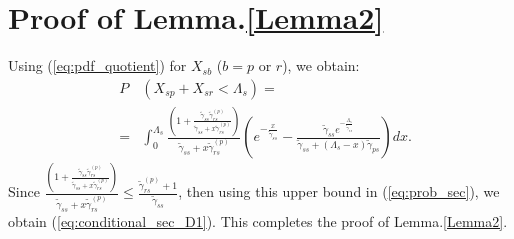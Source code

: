 \documentclass[conference,twocolumn]{IEEEtran}
\begin{document}
\section{Proof of Lemma.\ref{Lemma2}}
Using (\ref{eq:pdf_quotient}) for $X_{sb}$ ($b=p$ or $r$), we obtain:
\begin{eqnarray}
\label{eq:prob_sec}
&P&\left( X_{sp} + X_{sr} < \Lambda_s \right)=\\
\nonumber &=& \int_{0}^{\Lambda_s}{\frac{\left( 1+ \frac{\tilde{\gamma}_{ss}\tilde{\gamma}_{rs}^{(p)}}{\tilde{\gamma}_{ss}+x \tilde{\gamma}_{rs}^{(p)}}  \right)}{\tilde{\gamma}_{ss}+x \tilde{\gamma}_{rs}^{(p)}}} \left( e^{-\frac{x}{\tilde{\gamma}_{ss}}}- \frac{\tilde{\gamma}_{ss}e^{-\frac{\Lambda_s}{\tilde{\gamma}_{ss}}}}{\tilde{\gamma}_{ss}+ (\Lambda_s-x) \tilde{\gamma}_{ps}} \right)dx.
\end{eqnarray}
Since ${\frac{\left( 1+ \frac{\tilde{\gamma}_{ss}\tilde{\gamma}_{rs}^{(p)}}{\tilde{\gamma}_{ss}+x \tilde{\gamma}_{rs}^{(p)}}  \right)}{\tilde{\gamma}_{ss}+x \tilde{\gamma}_{rs}^{(p)}}}\leq \frac{\tilde{\gamma}_{rs}^{(p)}+1}{\tilde{\gamma}_{ss}}$, then using this upper bound in (\ref{eq:prob_sec}), we obtain (\ref{eq:conditional_sec_D1}).
This completes the proof of Lemma.\ref{Lemma2}.




\end{document}
